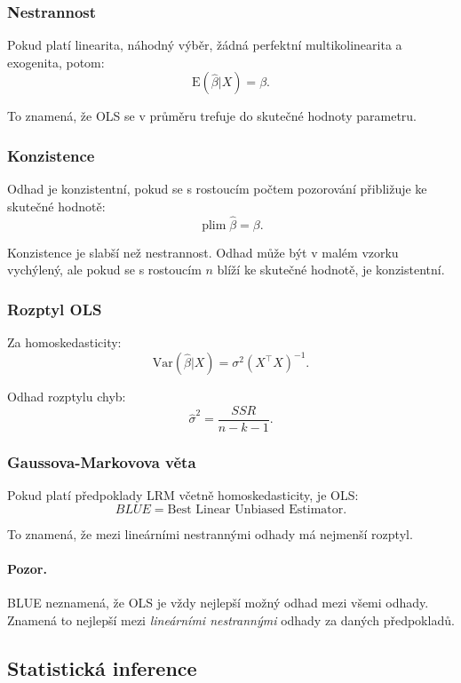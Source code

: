 \subsubsection{Nestrannost}

Pokud platí linearita, náhodný výběr, žádná perfektní multikolinearita a exogenita, potom:
\[
\mathrm{E}(\hat\beta|X)=\beta.
\]

To znamená, že OLS se v průměru trefuje do skutečné hodnoty parametru.

\subsubsection{Konzistence}

Odhad je konzistentní, pokud se s rostoucím počtem pozorování přibližuje ke skutečné hodnotě:
\[
\operatorname{plim}\hat\beta=\beta.
\]

Konzistence je slabší než nestrannost. Odhad může být v malém vzorku vychýlený, ale pokud se s rostoucím
$n$ blíží ke skutečné hodnotě, je konzistentní.

\subsubsection{Rozptyl OLS}

Za homoskedasticity:
\[
\mathrm{Var}(\hat\beta|X)=\sigma^2(X^\top X)^{-1}.
\]

Odhad rozptylu chyb:
\[
\hat\sigma^2 = \frac{SSR}{n-k-1}.
\]

\subsubsection{Gaussova-Markovova věta}

Pokud platí předpoklady LRM včetně homoskedasticity, je OLS:
\[
BLUE = \text{Best Linear Unbiased Estimator}.
\]

To znamená, že mezi lineárními nestrannými odhady má nejmenší rozptyl.

\paragraph{Pozor.}
BLUE neznamená, že OLS je vždy nejlepší možný odhad mezi všemi odhady. Znamená to nejlepší mezi
\emph{lineárními nestrannými} odhady za daných předpokladů.

\subsection{Statistická inference}

